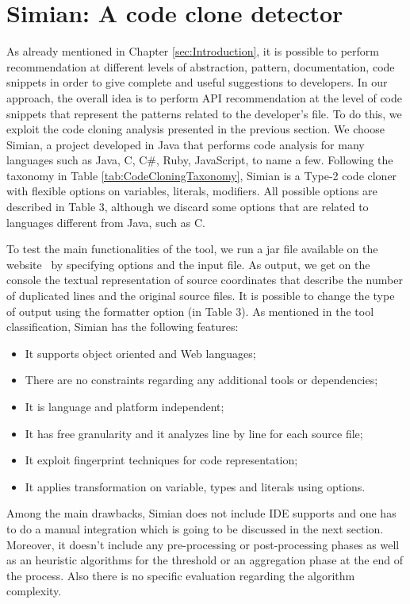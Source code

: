 \section{Simian: A code clone detector} \label{sec:Simian}

As already mentioned in Chapter \ref{sec:Introduction}, it is possible to perform recommendation at different levels of abstraction, \eg pattern, documentation, code snippets in order to give complete and useful suggestions to developers. In our approach, the overall idea is to perform API recommendation at the level of code snippets that represent the patterns related to the developer's file. To do this, we exploit the code cloning analysis presented in the previous section. We choose Simian, a project developed in Java that performs code analysis for many languages such as Java, C, C\#, Ruby, JavaScript, to name a few. Following the taxonomy in Table \ref{tab:CodeCloningTaxonomy}, Simian is a Type-2 code cloner with flexible options on variables, literals, modifiers. All possible options are described in Table 3, although we discard some options that are related to languages different from Java, such as C. 

To test the main functionalities of the tool, we run a jar file available on the website~\cite{https://www.harukizaemon.com/simian/_last_nodate} by specifying options and the input file. As output, we get on the console the textual representation of source coordinates that describe the number of duplicated lines and the original source files. It is possible to change the type of output using the formatter option (in Table 3). As mentioned in the tool classification, Simian has the following features: 

\begin{itemize}
	\item It supports object oriented and Web languages;
	\item There are no constraints regarding any additional tools or dependencies;
	\item It is language and platform independent;
	\item It has free granularity and it analyzes line by line for each source file;
	\item It exploit fingerprint techniques for code representation;
	\item It applies transformation on variable, types and literals using options.
\end{itemize}

Among the main drawbacks, Simian does not include IDE supports and one has to do a manual integration which is going to be discussed in the next section. Moreover, it doesn't include any pre-processing or post-processing phases as well as an heuristic algorithms for the threshold or an aggregation phase at the end of the process. Also there is no specific evaluation regarding the algorithm complexity. %

